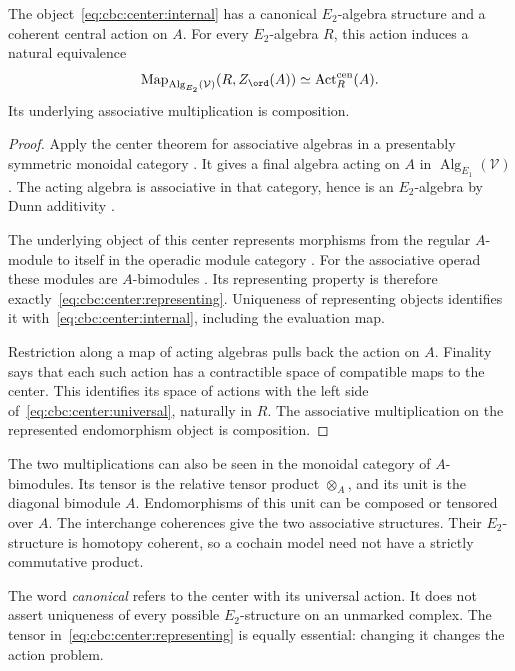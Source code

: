 \begin{theorem}\label{cbc:center:deligne}
The object~\eqref{eq:cbc:center:internal} has a canonical $E_2$-algebra structure and a coherent central action on $A$.
For every $E_2$-algebra $R$, this action induces a natural equivalence
\begin{equation}\label{eq:cbc:center:universal}
 \operatorname{Map}_{\operatorname{Alg}_{E_2}(\mathcal V)}
       (R,Z_{\ord}(A))
 \simeq \operatorname{Act}^{\mathrm{cen}}_R(A).
\end{equation}
Its underlying associative multiplication is composition.
\end{theorem}
\begin{proof}
Apply the center theorem for associative algebras in a presentably symmetric monoidal category
\cite[Corollary~5.3.1.15]{LurieHA}.
It gives a final algebra acting on $A$ in $\operatorname{Alg}_{E_1}(\mathcal V)$.
The acting algebra is associative in that category, hence is an $E_2$-algebra by Dunn additivity
\cite[Theorem~5.1.2.2]{LurieHA}.

The underlying object of this center represents morphisms from the regular $A$-module to itself in the operadic module category
\cite[Theorem~5.3.1.30]{LurieHA}.
For the associative operad these modules are $A$-bimodules
\cite[Theorem~4.4.1.28]{LurieHA}.
Its representing property is therefore exactly~\eqref{eq:cbc:center:representing}.
Uniqueness of representing objects identifies it with~\eqref{eq:cbc:center:internal}, including the evaluation map.

Restriction along a map of acting algebras pulls back the action on $A$.
Finality says that each such action has a contractible space of compatible maps to the center.
This identifies its space of actions with the left side of~\eqref{eq:cbc:center:universal}, naturally in $R$.
The associative multiplication on the represented endomorphism object is composition.
\end{proof}

The two multiplications can also be seen in the monoidal category of $A$-bimodules.
Its tensor is the relative tensor product $\otimes_A$, and its unit is the diagonal bimodule $A$.
Endomorphisms of this unit can be composed or tensored over $A$.
The interchange coherences give the two associative structures.
Their $E_2$-structure is homotopy coherent, so a cochain model need not have a strictly commutative product.

The word \emph{canonical} refers to the center with its universal action.
It does not assert uniqueness of every possible $E_2$-structure on an unmarked complex.
The tensor in~\eqref{eq:cbc:center:representing} is equally essential: changing it changes the action problem.

